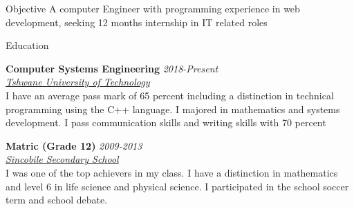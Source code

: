 \documentclass{resume} %
\newcommand{\sepspace}{\vspace*{1em}}           %
\newcommand{\EducationEntry}[4]{
        \noindent \textbf{#1} \hfill \textit{#2} \\     %
        \noindent \textit{#3} \\        %
        \noindent  #4  %
        \normalsize \par}
\begin{document}
\begin{rSection}{Objective}
{A computer Engineer with programming experience in web development, seeking 12 months internship in IT related roles}
\end{rSection}

\begin{rSection}{Education}
        \EducationEntry{Computer Systems Engineering}{2018-Present}
        {\href{https://www.tut.ac.za/} {Tshwane University of Technology}}
        {I have an average pass mark of 65 percent including a distinction in technical programming using the C++ language. I majored in mathematics and systems  development. I pass communication skills and writing skills with 70 percent}

        \EducationEntry{Matric (Grade 12)}{2009-2013}
        {\href{https://sincobilesecondaryschool.co.za/}{Sincobile Secondary School}}
        {I was one of the top achievers in my class. I have a distinction in mathematics and level 6 in life science and physical science. I participated in the school soccer term and school debate.}
\end{rSection}
\end{document}
